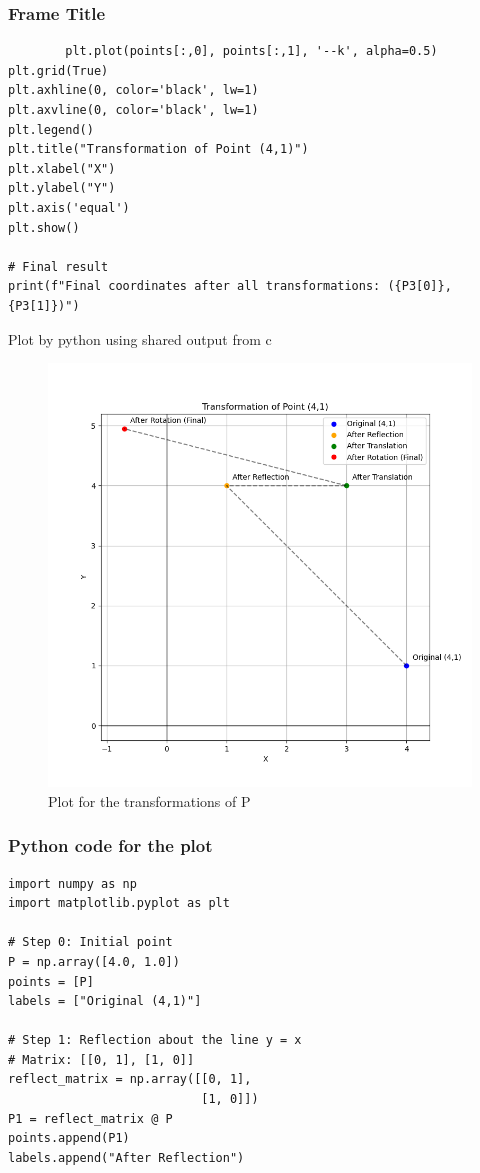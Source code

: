 \documentclass{beamer}
\begin{document}
\begin{frame}[fragile]
   \frametitle{Frame Title}
    \begin{lstlisting}
        plt.plot(points[:,0], points[:,1], '--k', alpha=0.5)
plt.grid(True)
plt.axhline(0, color='black', lw=1)
plt.axvline(0, color='black', lw=1)
plt.legend()
plt.title("Transformation of Point (4,1)")
plt.xlabel("X")
plt.ylabel("Y")
plt.axis('equal')
plt.show()

# Final result
print(f"Final coordinates after all transformations: ({P3[0]}, {P3[1]})")
    \end{lstlisting}
\end{frame}
\begin{frame}{Plot by python using shared output from c}
	\begin{center}
	\begin{figure}[H]
		\centering
		\includegraphics[width = 0.5\columnwidth]{figs/fig1.png}
		\caption{Plot for the transformations of P}
		\label{fig1}
	\end{figure}
	\end{center}
\end{frame}
\begin{frame}[fragile]
   \frametitle{Python code for the plot}
    \begin{lstlisting}
import numpy as np
import matplotlib.pyplot as plt

# Step 0: Initial point
P = np.array([4.0, 1.0])
points = [P]
labels = ["Original (4,1)"]

# Step 1: Reflection about the line y = x
# Matrix: [[0, 1], [1, 0]]
reflect_matrix = np.array([[0, 1],
                           [1, 0]])
P1 = reflect_matrix @ P
points.append(P1)
labels.append("After Reflection")


 \end{lstlisting}
\end{frame}
\end{document}
